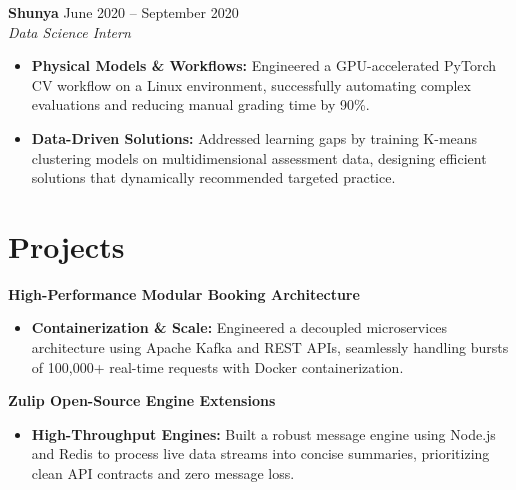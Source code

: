 \documentclass[11pt,a4paper]{article}
\begin{document}
\vspace{3pt}
\noindent
\textbf{Shunya} \hfill June 2020 -- September 2020 \\
\textit{Data Science Intern}
\begin{itemize}[leftmargin=*,noitemsep,topsep=0pt]
    \item \textbf{Physical Models \& Workflows:} Engineered a GPU-accelerated PyTorch CV workflow on a Linux environment, successfully automating complex evaluations and reducing manual grading time by 90\%.
    \item \textbf{Data-Driven Solutions:} Addressed learning gaps by training K-means clustering models on multidimensional assessment data, designing efficient solutions that dynamically recommended targeted practice.
\end{itemize}

\vspace{-5pt}
\section{Projects}
\noindent
\textbf{High-Performance Modular Booking Architecture}
\begin{itemize}[leftmargin=*,noitemsep,topsep=0pt]
    \item \textbf{Containerization \& Scale:} Engineered a decoupled microservices architecture using Apache Kafka and REST APIs, seamlessly handling bursts of 100,000+ real-time requests with Docker containerization.
\end{itemize}

\vspace{3pt}
\noindent
\textbf{Zulip Open-Source Engine Extensions}
\begin{itemize}[leftmargin=*,noitemsep,topsep=0pt]
    \item \textbf{High-Throughput Engines:} Built a robust message engine using Node.js and Redis to process live data streams into concise summaries, prioritizing clean API contracts and zero message loss.
\end{itemize}
\end{document}
